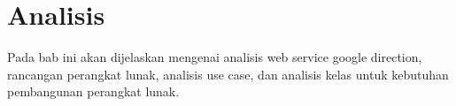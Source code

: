 \chapter{Analisis}
\label{chap:analisis}

Pada bab ini akan dijelaskan mengenai analisis web service google direction, rancangan perangkat lunak, analisis use case, dan analisis kelas untuk kebutuhan pembangunan perangkat lunak.

